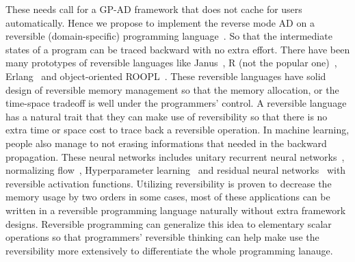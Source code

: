 \documentclass{article}
\newcommand{\<}{\langle}
\renewcommand{\>}{\rangle}
\theoremstyle{definition}\newtheorem{definition}{\textit{Definition}}
\begin{document}
    These needs call for a GP-AD framework that does not cache for users automatically. Hence we propose to implement the reverse mode AD on a reversible (domain-specific) programming language~\cite{Perumalla2013,Frank2017}. So that the intermediate states of a program can be traced backward with no extra effort. There have been many prototypes of reversible languages like Janus~\cite{Lutz1986}, R (not the popular one)~\cite{Frank1997}, Erlang~\cite{Lanese2018} and object-oriented ROOPL~\cite{Haulund2017}. %
These reversible languages have solid design of reversible memory management so that the memory allocation, or the time-space tradeoff is well under the programmers' control.
A reversible language has a natural trait that they can make use of reversibility so that there is no extra time or space cost to trace back a reversible operation. In machine learning, people also manage to not erasing informations that needed in the backward propagation. 
    These neural networks includes unitary recurrent neural networks~\cite{MacKay2018}, normalizing flow~\cite{Dinh2014}, Hyperparameter learning~\cite{Maclaurin2015} and residual neural networks~\cite{Behrmann2018} with reversible activation functions. Utilizing reversibility is proven to decrease the memory usage by two orders in some cases, most of these applications can be written in a reversible programming language naturally without extra framework designs. Reversible programming can generalize this idea to elementary scalar operations so that programmers' reversible thinking can help make use the reversibility more extensively to differentiate the whole programming lanauge.
\end{document}
